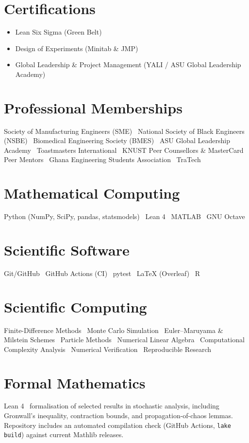 \documentclass[10.5pt]{article}
\begin{document}
\section*{Certifications}
\begin{itemize}
  \item Lean Six Sigma (Green Belt)
  \item Design of Experiments (Minitab \& JMP)
  \item Global Leadership \& Project Management (YALI / ASU Global Leadership Academy)
\end{itemize}

\section*{Professional Memberships}
\noindent Society of Manufacturing Engineers (SME) \textbullet\ National Society of Black Engineers (NSBE) \textbullet\
Biomedical Engineering Society (BMES) \textbullet\ ASU Global Leadership Academy \textbullet\ Toastmasters International
\textbullet\ KNUST Peer Counsellors \& MasterCard Peer Mentors \textbullet\ Ghana Engineering Students Association \textbullet\ TraTech

\section*{Mathematical Computing}
\noindent Python (NumPy, SciPy, pandas, statsmodels) \textbullet\ Lean 4 \textbullet\ MATLAB \textbullet\ GNU Octave

\section*{Scientific Software}
\noindent Git/GitHub \textbullet\ GitHub Actions (CI) \textbullet\ pytest \textbullet\ LaTeX (Overleaf) \textbullet\ R

\section*{Scientific Computing}
\noindent Finite-Difference Methods \textbullet\ Monte Carlo Simulation \textbullet\ Euler--Maruyama \& Milstein
Schemes \textbullet\ Particle Methods \textbullet\ Numerical Linear Algebra \textbullet\ Computational Complexity
Analysis \textbullet\ Numerical Verification \textbullet\ Reproducible Research

\section*{Formal Mathematics}
\noindent Lean 4 \textbullet\ formalisation of selected results in stochastic analysis, including Gronwall's
inequality, contraction bounds, and propagation-of-chaos lemmas. Repository includes an automated compilation
check (GitHub Actions, \texttt{lake build}) against current Mathlib releases.
\end{document}
